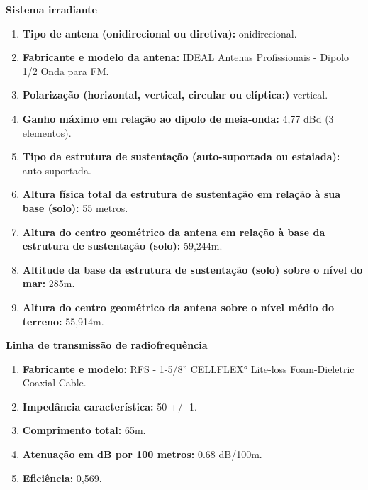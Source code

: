 \textbf{Sistema irradiante}

\begin{enumerate}

\item \textbf{Tipo de antena (onidirecional ou diretiva):} onidirecional.

\item \textbf{Fabricante e modelo da antena:} IDEAL Antenas Profissionais - Dipolo 1/2 Onda para FM.

\item \textbf{Polarização (horizontal, vertical, circular ou elíptica:)} vertical.

\item \textbf{Ganho máximo em relação ao dipolo de meia-onda:} 4,77 dBd (3 elementos).

\item \textbf{Tipo da estrutura de sustentação (auto-suportada ou estaiada):} auto-suportada.

\item \textbf{Altura física total da estrutura de sustentação em relação à sua base (solo):} 55 metros.

\item \textbf{Altura do centro geométrico da antena em relação à base da estrutura de sustentação (solo):} 59,244m.

\item \textbf{Altitude da base da estrutura de sustentação (solo) sobre o nível do mar:} 285m.

\item \textbf{Altura do centro geométrico da antena sobre o nível médio do terreno:} 55,914m.

\end{enumerate}

\textbf{Linha de transmissão de radiofrequência}

\begin{enumerate}

\item \textbf{Fabricante e modelo:} RFS - 1-5/8'' CELLFLEX° Lite-loss Foam-Dieletric Coaxial Cable.

\item \textbf{Impedância característica:} 50 +/- 1.

\item \textbf{Comprimento total:} 65m.

\item \textbf{Atenuação em dB por 100 metros:} 0.68 dB/100m.

\item \textbf{Eficiência:} 0,569.

\end{enumerate}

